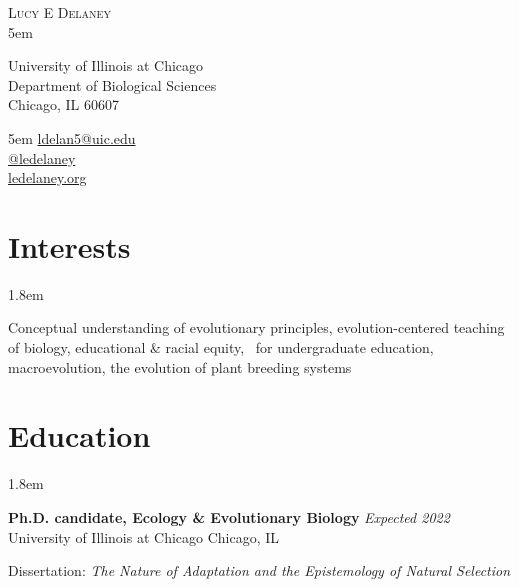\documentclass[]{article}
\begin{document}
\BgThispage
\pagestyle{alldocument}

{\fontsize{20}{64}\selectfont \textsc{Lucy E Delaney}}\\
\leftskip 5em
\begin{multicols}{2}

University of Illinois at Chicago\\
Department of Biological Sciences\\
Chicago, IL 60607

\columnbreak

\begin{flushright}
\rightskip 5em
\href{mailto:ldelan5@uic.edu}{ldelan5@uic.edu} \textcolor{light-gray}{\faPaperPlane}\\
\href{https://github.com/ledelaney}{@ledelaney} \textcolor{light-gray}{\faGithub}\\
\href{https://ledelaney.org}{ledelaney.org} \textcolor{light-gray}{\faDesktop}
\end{flushright}

\end{multicols}

\vspace{0.5mm}

\section{Interests}
\vspace{2mm}

\leftskip 1.8em

Conceptual understanding of evolutionary principles, evolution-centered teaching of biology, educational \& racial equity, \textcolor{light-gray}{\faRProject}\ for undergraduate education, macroevolution, the evolution of plant breeding systems

\vspace{2mm}
\section{Education}

\vspace{2mm}
\leftskip 1.8em

\textbf{Ph.D. candidate, Ecology \& Evolutionary Biology} \hfill \textit{Expected 2022}\\ 
University of Illinois at Chicago \hfill Chicago, IL
     
Dissertation: \emph{The Nature of Adaptation and the Epistemology of Natural Selection} 
\vspace{0.3cm}
\end{document}
